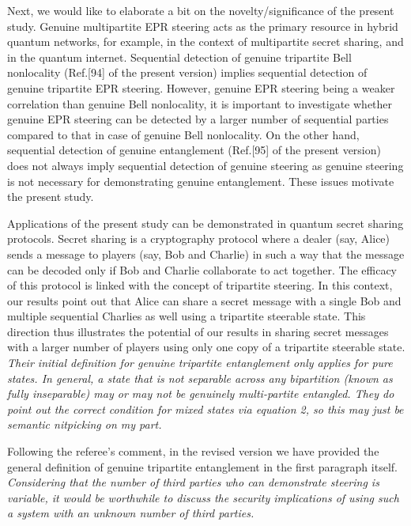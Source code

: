 \documentclass[12pt,showpacs,bibnotes,prl,onecolumn]{revtex4}
\newcommand{\red}{\color[rgb]{0.8,0,0}}
\newcommand{\blue}{\color[rgb]{0,0,0.6}}
\begin{document}
Next, we would like to elaborate a bit on the novelty/significance of the present study.
Genuine multipartite EPR steering acts as the primary resource in hybrid quantum networks, for example, in the context of multipartite secret sharing, and in the quantum internet.
Sequential detection of genuine tripartite Bell nonlocality (Ref.[94] of the present version) implies sequential detection of genuine tripartite EPR steering. However, genuine EPR steering being a weaker correlation than genuine Bell nonlocality, it is important to investigate whether genuine EPR steering can be detected by a larger number of sequential parties compared to that in case of genuine Bell nonlocality. On the other hand, sequential detection of genuine entanglement (Ref.[95] of the present version) does not always imply sequential detection of genuine steering as genuine steering is not necessary for demonstrating genuine entanglement. These issues motivate the present study.

Applications of the present study can  be demonstrated in   quantum secret sharing protocols. Secret sharing is a cryptography protocol where a dealer (say, Alice)  sends a message to players (say, Bob and Charlie) in  such a way that the message can be decoded only if Bob and Charlie collaborate to act together. The efficacy of this protocol is linked with the concept of tripartite steering. In this context, our results point out that Alice can share a secret message with a single Bob and multiple sequential Charlies as well using a tripartite steerable state. This direction thus illustrates the potential of our results in sharing secret messages with a larger number of players using only one copy of a tripartite steerable state. \\



{\red{\bf{Referee's Comment:}}} \textit{Their initial definition for genuine tripartite entanglement only applies for pure states. In general, a state that is not separable across any bipartition (known as fully inseparable) may or may not be genuinely multi-partite entangled. They do point out the correct condition for mixed states via equation 2, so this may just be semantic nitpicking on my part.}

{\blue{\bf{Author's Response:}}} Following the referee's comment, in the revised version we have provided the general definition of genuine tripartite entanglement in the first paragraph itself.\\

{\red{\bf{Referee's Comment:}}} \textit{Considering that the number of third parties who can demonstrate steering is variable, it would be worthwhile to discuss the security implications of using such a system with an unknown number of third parties.}
\end{document}
